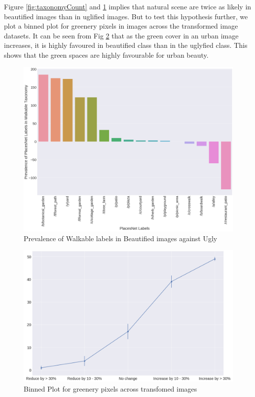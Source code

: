 Figure \ref{fig:taxonomyCount} and \ref{fig:WalkableTnomy} implies that natural scene are twice as likely in beautified images than in uglified images. But to test this hypothesis further, we plot a binned plot for greenery pixels in images across the transformed image datasets. It can be seen from Fig \ref{fig:greenBinned} that as the green cover in an urban image increases, it is highly favoured in beautified class than in the uglyfied class. This shows that the green spaces are highly favourable for urban beauty.

\begin{figure}[h]
	\centering
	\includegraphics[width=\columnwidth]{Plot/walkable_taxonomy.png}
	\caption{Prevalence of Walkable labels in Beautified images against Ugly}
	\label{fig:WalkableTnomy}
\end{figure}

\begin{figure}[h]
	\centering
	\includegraphics[width=\columnwidth]{Plot/Binned_deltas_trees.png}
	\caption{Binned Plot for greenery pixels across transfomed images}
	\label{fig:greenBinned}
\end{figure}



